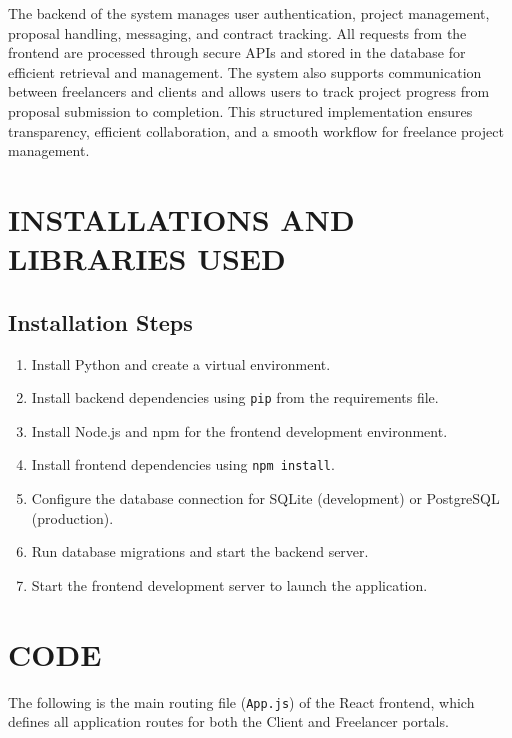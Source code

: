 \documentclass[12pt,a4paper,oneside]{report}
\numberwithin{figure}{chapter}
\numberwithin{table}{chapter}
\begin{document}
\indent The backend of the system manages user authentication, project management,
proposal handling, messaging, and contract tracking. All requests from the frontend are
processed through secure APIs and stored in the database for efficient retrieval and
management. The system also supports communication between freelancers and clients and
allows users to track project progress from proposal submission to completion. This
structured implementation ensures transparency, efficient collaboration, and a smooth
workflow for freelance project management.

\section{INSTALLATIONS AND LIBRARIES USED}

\subsection{Installation Steps}

\begin{enumerate}[leftmargin=2em]
  \item Install Python and create a virtual environment.
  \item Install backend dependencies using \texttt{pip} from the requirements file.
  \item Install Node.js and npm for the frontend development environment.
  \item Install frontend dependencies using \texttt{npm install}.
  \item Configure the database connection for SQLite (development) or PostgreSQL
        (production).
  \item Run database migrations and start the backend server.
  \item Start the frontend development server to launch the application.
\end{enumerate}

\section{CODE}

The following is the main routing file (\texttt{App.js}) of the React frontend, which
defines all application routes for both the Client and Freelancer portals.
\end{document}
